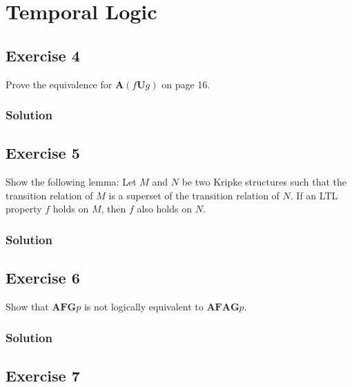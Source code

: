 \documentclass[a4paper, 12pt]{article}
\newcommand{\codeinput}[1]
{
    \begin{leftbar}
        {\fontsize{9pt}{11pt}}
    \end{leftbar}
}
\begin{document}
\codeinput{bdd_to_formula}

\section{Temporal Logic}

\subsection{Exercise 4}

Prove the equivalence for $\mathbf{A}(f \mathbf{U} g)$ on page 16.

\subsubsection{Solution}



\subsection{Exercise 5}

Show the following lemma: Let $M$ and $N$ be two Kripke structures such that
the transition relation of $M$ is a superset of the transition relation of
$N$. If an LTL property $f$ holds on $M$, then $f$ also holds on $N$.

\subsubsection{Solution}



\subsection{Exercise 6}

Show that $\mathbf{AFG} p$ is not logically equivalent to $\mathbf{AFAG} p$.

\subsubsection{Solution}



\subsection{Exercise 7}
\end{document}
